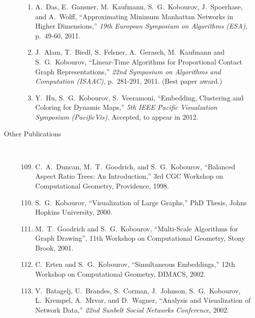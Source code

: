 \documentclass[10pt]{article}
\begin{document}
\begin{description}
\begin{enumerate}
\item A.~Das, E.~Gansner, M.~Kaufmann, S.~G.~Kobourov, J.~Spoerhase,
  and A.~Wolff, ``Approximating Minimum Manhattan Networks in Higher
  Dimensions,'' {\em 19th European Symposium on Algorithms (ESA)}, p.~49-60, 2011.

\item  J.~Alam, T.~Biedl, S.~Felsner, A.~Gerasch, M.~Kaufmann and
  S.~G.~Kobourov, ``Linear-Time Algorithms for Proportional Contact
  Graph Representations,'' {\em  22nd Symposium on Algorithms and
    Computation (ISAAC)}, p.~281-291, 2011. (Best paper award.)

\item Y.~Hu, S.~G.~Kobourov, S.~Veeramoni, ``Embedding, Clustering and Coloring for Dynamic Maps,'' {\em 5th IEEE Pacific Visualzation Symposium (PacificVis)}. Accepted, to appear in 2012.

\end{enumerate}

\item [Other Publications]\

\begin{enumerate}
\setcounter{enumi}{108}

\item C.~A.~Duncan, M.~T.~Goodrich, and S.~G.~Kobourov,
``Balanced Aspect Ratio Trees: An Introduction,'' 3rd CGC Workshop on Computational Geometry, Providence, 1998.

\item S.~G.~Kobourov, ``Visualization of Large Graphs,'' PhD Thesis, Johns Hopkins University, 2000.

\item M.~T.~Goodrich and S.~G.~Kobourov, ``Multi-Scale Algorithms for Graph Drawing'', 11th Workshop on Computational Geometry, Stony Brook, 2001.

\item C.~Erten and S.~G.~Kobourov, ``Simultaneous Embeddings,'' 12th Workshop on Computational Geometry, DIMACS, 2002.

\item V.~Batagelj, U.~Brandes, S.~Corman, J.~Johnson, S.~G.~Kobourov, L.~Krempel, A.~Mrvar, and D.~Wagner, ``Analysis and Visualization of Network Data,'' {\em 22nd Sunbelt Social Networks Conference}, 2002.



\end{enumerate}
\end{description}
\end{document}
